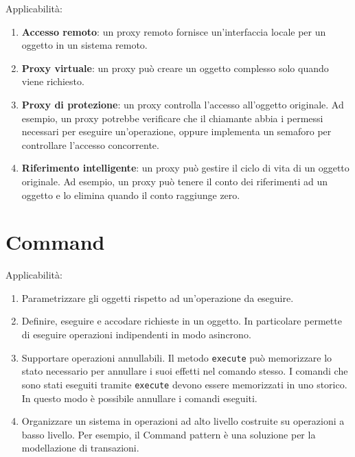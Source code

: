 \documentclass[12pt]{article}
\begin{document}
Applicabilità:
\begin{enumerate}
	\item \textbf{Accesso remoto}: un proxy remoto fornisce un'interfaccia
	      locale per un oggetto in un sistema remoto.

	\item \textbf{Proxy virtuale}: un proxy può creare un oggetto complesso solo
	      quando viene richiesto.

	\item \textbf{Proxy di protezione}: un proxy controlla l'accesso all'oggetto
	      originale. Ad esempio, un proxy potrebbe verificare che il chiamante
	      abbia i permessi necessari per eseguire un'operazione, oppure
	      implementa un semaforo per controllare l'accesso concorrente.

	\item \textbf{Riferimento intelligente}: un proxy può gestire il ciclo di
	      vita di un oggetto originale. Ad esempio, un proxy può tenere il conto
	      dei riferimenti ad un oggetto e lo elimina quando il conto raggiunge
	      zero.
\end{enumerate}

\section{Command}

Applicabilità:
\begin{enumerate}
	\item Parametrizzare gli oggetti rispetto ad un'operazione da eseguire.

	\item Definire, eseguire e accodare richieste in un oggetto. In particolare
	      permette di eseguire operazioni indipendenti in modo asincrono.

	\item Supportare operazioni annullabili. Il metodo \texttt{execute} può
	      memorizzare lo stato necessario per annullare i suoi effetti nel
	      comando stesso. I comandi che sono stati eseguiti tramite
	      \texttt{execute} devono essere memorizzati in uno storico. In questo
	      modo è possibile annullare i comandi eseguiti.

	\item Organizzare un sistema in operazioni ad alto livello costruite su
	      operazioni a basso livello. Per esempio, il Command pattern è una
	      soluzione per la modellazione di transazioni.
\end{enumerate}
\end{document}

